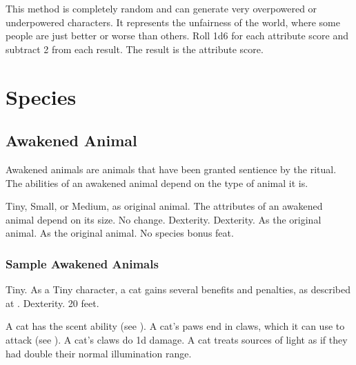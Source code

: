             This method is completely random and can generate very overpowered or underpowered characters. It represents the unfairness of the world, where some people are just better or worse than others. Roll 1d6 for each attribute score and subtract 2 from each result. The result is the attribute score.

\newpage

\section{Species}

    \subsection{Awakened Animal}

        Awakened animals are animals that have been granted sentience by the  ritual.
        The abilities of an awakened animal depend on the type of animal it is.

         Tiny, Small, or Medium, as original animal.
         The attributes of an awakened animal depend on its size.
         No change.
          Dexterity.
          Dexterity.
         As the original animal.
         As the original animal.
         No species bonus feat.

        \subsubsection{Sample Awakened Animals}


             Tiny. As a Tiny character, a cat gains several benefits and penalties, as described at .
              Dexterity.
             20 feet.
            \begin{itemize}
                 A cat has the scent ability (see ).
                 A cat's paws end in claws, which it can use to attack (see ). A cat's claws do \minus1d damage.
                 A cat treats sources of light as if they had double their normal illumination range.
            \end{itemize}

